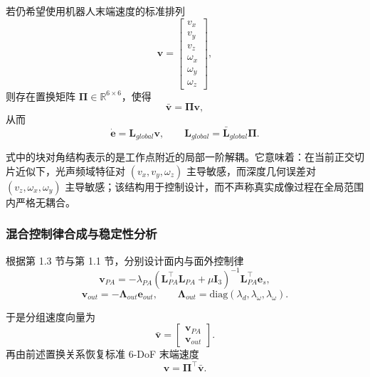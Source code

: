 \documentclass{article}
\begin{document}
若仍希望使用机器人末端速度的标准排列
\begin{equation}
\mathbf{v} =
\begin{bmatrix}
v_x \\ v_y \\ v_z \\ \omega_x \\ \omega_y \\ \omega_z
\end{bmatrix},
\end{equation}
则存在置换矩阵 $\mathbf{\Pi} \in \mathbb{R}^{6\times 6}$，使得
\begin{equation}
\bar{\mathbf{v}} = \mathbf{\Pi}\mathbf{v},
\end{equation}
从而
\begin{equation}
\dot{\mathbf{e}} = \mathbf{L}_{global}\mathbf{v}, \qquad
\mathbf{L}_{global} = \bar{\mathbf{L}}_{global}\mathbf{\Pi}.
\end{equation}

式中的块对角结构表示的是工作点附近的局部一阶解耦。它意味着：在当前正交切片近似下，光声频域特征对 $(v_x,v_y,\omega_z)$ 主导敏感，而深度几何误差对 $(v_z,\omega_x,\omega_y)$ 主导敏感；该结构用于控制设计，而不声称真实成像过程在全局范围内严格无耦合。

\subsubsection{混合控制律合成与稳定性分析}

根据第 1.3 节与第 1.1 节，分别设计面内与面外控制律
\begin{equation}
\mathbf{v}_{PA}
=
-\lambda_{PA}
(\mathbf{L}_{PA}^{\top}\mathbf{L}_{PA} + \mu \mathbf{I}_3)^{-1}
\mathbf{L}_{PA}^{\top}\mathbf{e}_{s},
\end{equation}
\begin{equation}
\mathbf{v}_{out} = -\boldsymbol{\Lambda}_{out}\mathbf{e}_{out}, \qquad
\boldsymbol{\Lambda}_{out} = \mathrm{diag}(\lambda_d,\lambda_{\omega},\lambda_{\omega}).
\end{equation}

于是分组速度向量为
\begin{equation}
\bar{\mathbf{v}} =
\begin{bmatrix}
\mathbf{v}_{PA} \\ \mathbf{v}_{out}
\end{bmatrix}.
\end{equation}
再由前述置换关系恢复标准 6-DoF 末端速度
\begin{equation}
\mathbf{v} = \mathbf{\Pi}^{\top}\bar{\mathbf{v}}.
\end{equation}
\end{document}
